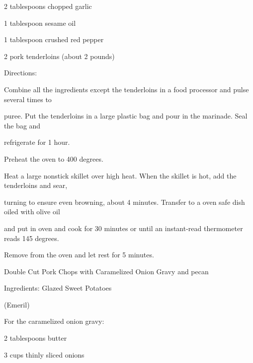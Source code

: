 \documentclass[a4paper,portrait,12pt]{book}
\begin{document}
2 tablespoons chopped garlic




1 tablespoon sesame oil




1 tablespoon crushed red pepper




2 pork tenderloins (about 2 pounds)




Directions:




Combine all the ingredients except the tenderloins in a food processor and pulse several times to




puree. Put the tenderloins in a large plastic bag and pour in the marinade. Seal the bag and




refrigerate for 1 hour.




Preheat the oven to 400 degrees.




Heat a large nonstick skillet over high heat. When the skillet is hot, add the tenderloins and sear,




turning to ensure even browning, about 4 minutes. Transfer to a oven safe dish oiled with olive oil




and put in oven and cook for 30 minutes or until an instant-read thermometer reads 145 degrees.




Remove from the oven and let rest for 5 minutes.







\newpage
Double Cut Pork Chops with Caramelized Onion Gravy and pecan




Ingredients:
Glazed Sweet Potatoes




(Emeril)




For the caramelized onion gravy:




2 tablespoons butter




3 cups thinly sliced onions
\end{document}
